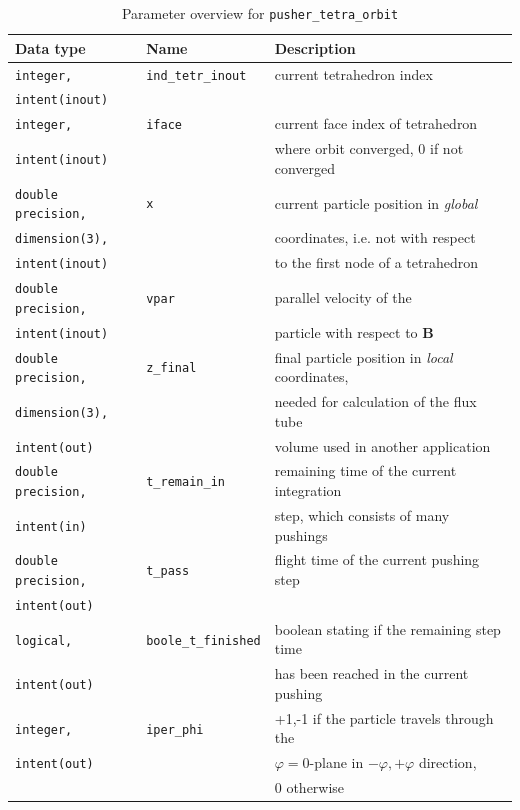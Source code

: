 \documentclass[./main.tex]{subfiles}
\begin{document}
\begin{centering}
	\begin{table}[H]
		
		\caption{Parameter overview for \texttt{pusher\_tetra\_orbit}}
		\begin{tabular}{|l|l|l|}
			\hline
			\rowcolor{lightgray}
			Data type&Name&Description \\
\hline
\texttt{integer,}		&\texttt{ind\_tetr\_inout}&current tetrahedron index\\
\texttt{intent(inout)}		&&\\
\hline
\texttt{integer,}		&\texttt{iface}&current face index of tetrahedron\\
\texttt{intent(inout)}		&&where orbit converged, 0 if not converged\\
\hline
\texttt{double precision,}			&\texttt{x}&current particle position in \textit{global}\\
\texttt{dimension(3),}			&& coordinates, i.e. not with respect\\
\texttt{intent(inout)}			&& to the first node of a tetrahedron\\
\hline
\texttt{double precision,}			&\texttt{vpar}&parallel velocity of the\\
\texttt{intent(inout)}			&& particle with respect to $\textbf{B}$\\
\hline
\texttt{double precision,}			&\texttt{z\_final}& final particle position in \textit{local} coordinates,\\
\texttt{dimension(3),}				&&  needed for calculation of the flux tube \\
\texttt{intent(out)}				&& volume used in another application\\
\hline
\texttt{double precision,}			&\texttt{t\_remain\_in}& remaining time of the current integration\\
\texttt{intent(in)}			&& step, which consists of many pushings\\
\hline
\texttt{double precision,}			&\texttt{t\_pass}&flight time of the current pushing step\\
\texttt{intent(out)}			&&\\
\hline
\texttt{logical,}			&\texttt{boole\_t\_finished}&boolean stating if the remaining step time \\
\texttt{intent(out)}			&&has been reached in the current pushing\\
\hline
\texttt{integer,}			&\texttt{iper\_phi}&+1,-1 if the particle travels through the\\
\texttt{intent(out)}			&& $\varphi=0$-plane in $-\varphi,+\varphi$ direction, \\
			&&0 otherwise\\
\hline
		\end{tabular}
		\label{tab:input_pusher_tetra_orbit}

	\end{table}
\end{centering}
\end{document}
